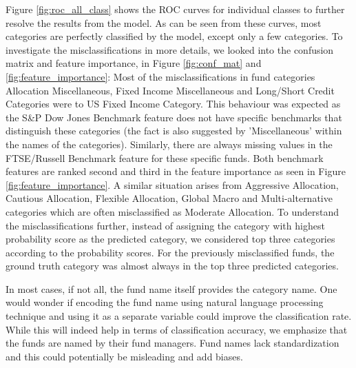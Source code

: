 \documentclass[sigconf]{acmart}
\begin{document}
Figure \ref{fig:roc_all_class} shows the ROC curves for individual classes to further resolve the results from the model. As can be seen from these curves, most categories are perfectly classified by the model, except only a few categories. To investigate the misclassifications in more details, we looked into the confusion matrix and feature importance, in Figure \ref{fig:conf_mat} and \ref{fig:feature_importance}: Most of the misclassifications in fund categories Allocation Miscellaneous, Fixed Income Miscellaneous and Long/Short Credit Categories were to US Fixed Income Category. This behaviour was expected as the S\&P Dow Jones Benchmark feature does not have specific benchmarks that distinguish these categories (the fact is also suggested by 'Miscellaneous' within the names of the categories). Similarly, there are always missing values in the FTSE/Russell Benchmark feature for these specific funds. Both benchmark features are ranked second and third in the feature importance as seen in Figure \ref{fig:feature_importance}. A similar situation arises from Aggressive Allocation, Cautious Allocation, Flexible Allocation, Global Macro and Multi-alternative categories which are often misclassified as Moderate Allocation.
To understand the misclassifications further, instead of assigning the category with highest probability score as the predicted category, we considered top three categories according to the probability scores. For the previously misclassified funds, the ground truth category was almost always in the top three predicted categories.

In most cases, if not all, the fund name itself provides the category name. One would wonder if encoding the fund name using natural language processing technique and using it as a separate variable could improve the classification rate. While this will indeed help in terms of classification accuracy, we emphasize that the funds are named by their fund managers. Fund names lack standardization and this could potentially be misleading and add biases. 
\end{document}
